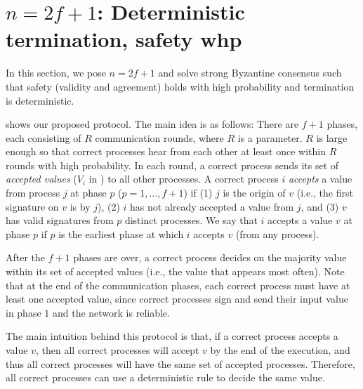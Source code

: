 \section{$n = 2f+1$: Deterministic termination, safety whp}\label{sec:2f+1}

In this section, we pose $n=2f+1$ and solve strong Byzantine consensus such that safety (validity and agreement) holds with high probability and termination is deterministic.

 shows our proposed protocol. The main idea is as follows: There are $f+1$ phases, each consisting of $R$ communication rounds, where $R$ is a parameter. $R$ is large enough so that correct processes hear from each other at least once within $R$ rounds with high probability. In each round, a correct process sends its set of \textit{accepted values} ($V_i$ in ) to all other processes. A correct process $i$ \textit{accepts} a value from process $j$ at phase $p$ ($p = 1,\ldots,f+1$) if (1) $j$ is the origin of $v$ (i.e., the first signature on $v$ is by $j$), (2) $i$ has not already accepted a value from $j$, and (3) $v$ has valid signatures from $p$ distinct processes. We say that $i$ accepts a value $v$ at phase $p$ if $p$ is the earliest phase at which $i$ accepts $v$ (from any process).

After the $f+1$ phases are over, a correct process decides on the majority value within its set of accepted values (i.e., the value that appears most often). Note that at the end of the communication phases, each correct process must have at least one accepted value, since correct processes sign and send their input value in phase $1$ and the network is reliable.


The main intuition behind this protocol is that, if a correct process accepts a value $v$, then all correct processes will accept $v$ by the end of the execution, and thus all correct processes will have the same set of accepted processes. Therefore, all correct processes can use a deterministic rule to decide the same value.

